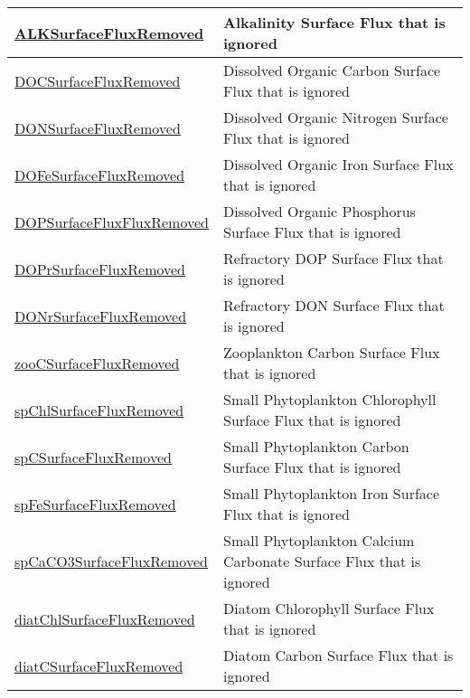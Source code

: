 {\begin{center}
\begin{longtable}{| p{2.0in} | p{4.0in} |}
    \hline
    \hyperref[subsec:var_sec_forcing_ALKSurfaceFluxRemoved]{ALKSurfaceFluxRemoved} & Alkalinity Surface Flux that is ignored \\
    \hline
    \hyperref[subsec:var_sec_forcing_DOCSurfaceFluxRemoved]{DOCSurfaceFluxRemoved} & Dissolved Organic Carbon Surface Flux that is ignored \\
    \hline
    \hyperref[subsec:var_sec_forcing_DONSurfaceFluxRemoved]{DONSurfaceFluxRemoved} & Dissolved Organic Nitrogen Surface Flux that is ignored \\
    \hline
    \hyperref[subsec:var_sec_forcing_DOFeSurfaceFluxRemoved]{DOFeSurfaceFluxRemoved} & Dissolved Organic Iron Surface Flux that is ignored \\
    \hline
    \hyperref[subsec:var_sec_forcing_DOPSurfaceFluxFluxRemoved]{DOPSurfaceFluxFluxRemoved} & Dissolved Organic Phosphorus Surface Flux that is ignored \\
    \hline
    \hyperref[subsec:var_sec_forcing_DOPrSurfaceFluxRemoved]{DOPrSurfaceFluxRemoved} & Refractory DOP Surface Flux that is ignored \\
    \hline
    \hyperref[subsec:var_sec_forcing_DONrSurfaceFluxRemoved]{DONrSurfaceFluxRemoved} & Refractory DON Surface Flux that is ignored \\
    \hline
    \hyperref[subsec:var_sec_forcing_zooCSurfaceFluxRemoved]{zooCSurfaceFluxRemoved} & Zooplankton Carbon Surface Flux that is ignored \\
    \hline
    \hyperref[subsec:var_sec_forcing_spChlSurfaceFluxRemoved]{spChlSurfaceFluxRemoved} & Small Phytoplankton Chlorophyll Surface Flux that is ignored \\
    \hline
    \hyperref[subsec:var_sec_forcing_spCSurfaceFluxRemoved]{spCSurfaceFluxRemoved} & Small Phytoplankton Carbon Surface Flux that is ignored \\
    \hline
    \hyperref[subsec:var_sec_forcing_spFeSurfaceFluxRemoved]{spFeSurfaceFluxRemoved} & Small Phytoplankton Iron Surface Flux that is ignored \\
    \hline
    \hyperref[subsec:var_sec_forcing_spCaCO3SurfaceFluxRemoved]{spCaCO3SurfaceFluxRemoved} & Small Phytoplankton Calcium Carbonate Surface Flux that is ignored \\
    \hline
    \hyperref[subsec:var_sec_forcing_diatChlSurfaceFluxRemoved]{diatChlSurfaceFluxRemoved} & Diatom Chlorophyll Surface Flux that is ignored \\
    \hline
    \hyperref[subsec:var_sec_forcing_diatCSurfaceFluxRemoved]{diatCSurfaceFluxRemoved} & Diatom Carbon Surface Flux that is ignored \\

\end{longtable}
\end{center}}
